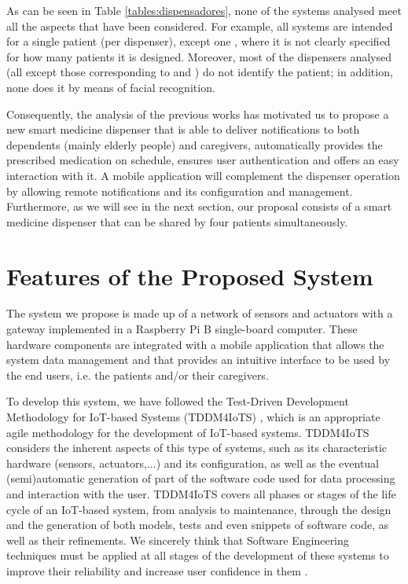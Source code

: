 \documentclass{IOS-Book-Article}
\begin{document}
As can be seen in Table \ref{tables:dispensadores}, none of the systems analysed meet all the aspects that have been considered. For example, all systems are intended for a single patient (per dispenser), except one \cite{r18}, where it is not clearly specified for how many patients it is designed. Moreover, most of the dispensers analysed (all except those corresponding to \cite{r7} and \cite{r18}) do not identify the patient; in addition, none does it by means of facial recognition.

Consequently, the analysis of the previous works has motivated us to propose a new smart medicine dispenser that is able to deliver notifications to both dependents (mainly elderly people) and caregivers, automatically provides the prescribed medication on schedule, ensures user authentication and offers an easy interaction with it. A mobile application will complement the dispenser operation by allowing remote notifications and its configuration and management. Furthermore, as we will see in the next section, our proposal consists of a smart medicine dispenser that can be shared by four patients simultaneously.

\section{Features of the Proposed System}

The system we propose is made up of a network of sensors and actuators with a gateway implemented in a Raspberry Pi B single-board computer. These hardware components are integrated with a mobile application that allows the system data management and that provides an intuitive interface to be used by the end users, i.e. the patients and/or their caregivers.

To develop this system, we have followed the Test-Driven Development Methodology for IoT-based Systems (TDDM4IoTS) \cite{r4}, which is an appropriate agile methodology for the development of IoT-based systems. TDDM4IoTS considers the inherent aspects of this type of systems, such as its characteristic hardware (sensors, actuators,...) and its configuration, as well as the eventual (semi)automatic generation of part of the software code used for data processing and interaction with the user. TDDM4IoTS covers all phases or stages of the life cycle of an IoT-based system, from analysis to maintenance, through the design and the generation of both models, tests and even snippets of software code, as well as their refinements. We sincerely think that Software Engineering techniques must be applied at all stages of the development of these systems to improve their reliability \cite{r23} and increase user confidence in them \cite{r24}.
\end{document}
